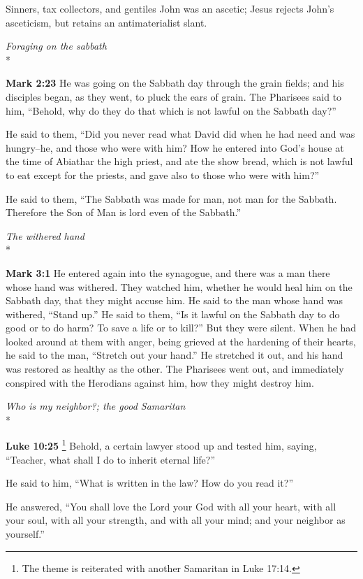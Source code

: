 \documentclass[10pt,twoside]{article} %
\newcommand{\doimage}[2]{\texttt{[image: \#2]}\label{fig:#2}}
\newcommand{\figbasic}[4]{ %
    \ifthenelse{\isodd{\pageref{fig:#2}}}{}{\hfill}
    \ifstrempty{#3}{
      \doimage{#1}{#2}
    }{
      \makebox{\doimage{#1}{#2} \\ #3}
    }
    \ifthenelse{\isodd{\pageref{fig:#2}}}{\hfill}{}
    \par
}
\newcommand{\fig}[2][0.4]{
  \figbasic{#1}{#2}{}{}
}
\newcommand{\quotesize}{\normalsize{}}
\newcommand{\comm}[1]{\begingroup \color{black!50} #1\endgroup}
\newenvironment{quotetext}{\begingroup\quotesize}{\endgroup}
\newcommand{\intex}[1]{\index[texts]{#1}}
\newcommand{\reftex}[1]{#1\intex{#1}}
\newcommand{\bible}[2]{\begin{quotetext}\textbf{#1}\intex{#1} #2\end{quotetext}}
\newcommand{\gospelmark}[2]{\bible{Mark #1}{#2}}
\newcommand{\luke}[2]{\bible{Luke #1}{#2}}
\newcommand{\subhead}[1]{\emph{#1}\\*}
\begin{document}
\begin{section}{Sinners, tax collectors, and gentiles}
\comm{
John was an ascetic;
Jesus rejects John's asceticism, but retains an antimaterialist slant.
}

\fig{plucking-corn-on-the-sabbath}

\subhead{Foraging on the sabbath}

\gospelmark{2:23}{He was going on the Sabbath day through the grain fields; and his disciples began, as they went, to pluck the ears of grain.   The Pharisees said to him, ``Behold, why do they do that which is not lawful on the Sabbath day?''

  He said to them, ``Did you never read what David did when he had need and was hungry--he, and those who were with him?    How he entered into God's house at the time of Abiathar the high priest, and ate the show bread, which is not lawful to eat except for the priests, and gave also to those who were with him?''

  He said to them, ``The Sabbath was made for man, not man for the Sabbath.    Therefore the Son of Man is lord even of the Sabbath.'' 
}


\subhead{The withered hand}

\gospelmark{3:1}{
He entered again into the synagogue, and there was a man there whose hand was withered.   They watched him, whether he would heal him on the Sabbath day, that they might accuse him.   He said to the man whose hand was withered, ``Stand up.''   He said to them, ``Is it lawful on the Sabbath day to do good or to do harm? To save a life or to kill?'' But they were silent.   When he had looked around at them with anger, being grieved at the hardening of their hearts, he said to the man, ``Stretch out your hand.'' He stretched it out, and his hand was restored as healthy as the other.   The Pharisees went out, and immediately conspired with the Herodians against him, how they might destroy him.}

\fig[1]{good-samaritan}

\subhead{Who is my neighbor?; the good Samaritan}\label{good-samaritan}

\luke{10:25}{\footnote{The theme is reiterated with another Samaritan in \reftex{Luke 17:14}.}
Behold, a certain lawyer stood up and tested him, saying, ``Teacher, what shall I do to inherit eternal life?''

  He said to him, ``What is written in the law? How do you read it?''

  He answered, ``You shall love the Lord your God with all your heart, with all your soul, with all your strength, and with all your mind; and your neighbor as yourself.''

}
\end{section}
\end{document}
